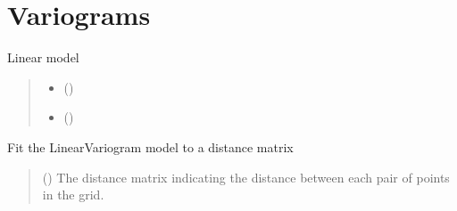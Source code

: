 \documentclass[letterpaper,10pt,english]{sphinxmanual}
\begin{document}
\section{Variograms}
\label{\detokenize{covariance:variograms}}

\begin{fulllineitems}
\label{\detokenize{covariance:glomar_gridding.variogram.LinearVariogram}}
\pysigstartsignatures
\pysiglinewithargsret
{}
{\sphinxparamcomma {}}
{}
\pysigstopsignatures
\sphinxAtStartPar
Linear model
\begin{quote}\begin{description}
\begin{itemize}
\item {}
\sphinxAtStartPar
{} (\sphinxstyleliteralemphasis{\sphinxupquote{ | }})

\item {}
\sphinxAtStartPar
{} (\sphinxstyleliteralemphasis{\sphinxupquote{ | }})

\end{itemize}

\end{description}\end{quote}

\begin{fulllineitems}
\label{\detokenize{covariance:glomar_gridding.variogram.LinearVariogram.fit}}
\pysigstartsignatures
\pysiglinewithargsret
{}
{}
{}
\pysigstopsignatures
\sphinxAtStartPar
Fit the LinearVariogram model to a distance matrix
\begin{quote}\begin{description}
\sphinxAtStartPar
{} (\sphinxstyleliteralemphasis{\sphinxupquote{ | }}) \textendash{} The distance matrix indicating the distance between each pair of
points in the grid.


\end{description}
\end{quote}
\end{fulllineitems}
\end{fulllineitems}
\end{document}
